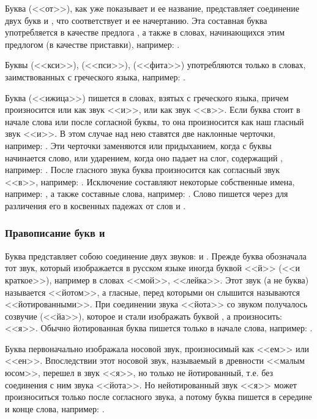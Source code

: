 \documentclass[11pt,a4paper,oneside]{memoir}
\begin{document}
    Буква {} (<<от>>), как уже показывает и ее название, представляет соединение двух букв {} и {}, что соответствует и ее начертанию. Эта составная буква употребляется в качестве предлога {}, а также в словах, начинающихся этим предлогом (в качестве приставки), например: {}.

    Буквы {} (<<кси>>), {} (<<пси>>), {} (<<фита>>) употребляются только в словах, заимствованных с греческого языка, например: {}.

    Буква {} (<<ижица>>) пишется в словах, взятых с греческого языка, причем произносится или как звук <<и>>, или как звук <<в>>. Если буква {} стоит в начале слова или после согласной буквы, то она произносится как наш гласный звук <<и>>. В этом случае над нею ставятся две наклонные черточки, например: {}. Эти черточки заменяются или придыханием, когда с буквы {} начинается слово, или ударением, когда оно падает на слог, содержащий {}, например: {}. После гласного звука буква {} произносится как согласный звук <<в>>, например: {}. Исключение составляют некоторые собственные имена, например: {}, а также составные слова, например: {}. Слово {} пишется через {} для различения его в косвенных падежах от слов {} и {}.


                \subsubsection{Правописание букв {\large{}} и {\large{}}}

    Буква {} представляет собою соединение двух звуков: {} и {}. Прежде буква {} обозначала тот звук, который изображается в русском языке иногда буквой <<й>> (<<и краткое>>), например в словах <<мой>>, <<лейка>>. Этот звук (а не буква) называется <<йотом>>, а гласные, перед которыми он слышится называются <<йотированными>>. При соединении звука <<йота>> со звуком {} получалось созвучие {} (<<йа>>), которое и стали изображать буквой {}, а произносить: <<я>>. Обычно йотированная буква {} пишется только в начале слова, например: {}.
    
    Буква {} первоначально изображала носовой звук, произносимый как <<ем>> или <<ен>>. Впоследствии этот носовой звук, называемый в древности <<малым юсом>>, перешел в звук <<я>>, но только не йотированный, т.е. без соединения с ним звука <<йота>>. Но нейотированный звук <<я>> может произноситься только после согласного звука, а потому буква {} пишется в середине и конце слова, например: {}.
    
\end{document}
